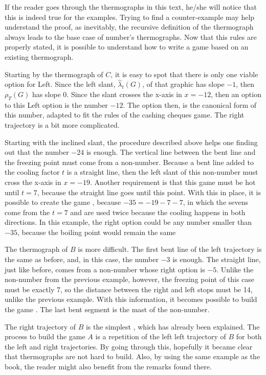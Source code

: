 If the reader goes through the thermographs in this text, he/she will notice that this is indeed true for the examples. Trying to find a counter-example may help understand the proof, as inevitably, the recursive definition of the thermograph always leads to the base case of number's thermographs. Now that this rules are properly stated, it is possible to understand how to write a game  based on an existing thermograph.

Starting by the thermograph of $C$, it is easy to spot that there is only one viable option for Left. Since the left slant, $\overset{\sim}{\lambda}_t(G)$, of that graphic has slope ${-1}$, then $\rho_T(G)$ has slope 0. Since the slant crosses the x-axis in $x={-12}$, then an option to this Left option is the number ${-12}$. The option then, is the canonical form of this number, adapted to fit the rules of the cashing cheques game. The right trajectory is a bit more complicated.

Starting with the inclined slant, the procedure described above helps one finding out that the number ${-24}$ is enough. The vertical line between the bent line and the freezing point must come from a non-number. Because a bent line added to the cooling factor $t$ is a straight line, then the left slant of this non-number must cross the x-axis in $x={-19}$. Another requirement is that this game must be hot until $t=7$, because the straight line goes until this point. With this in place, it is possible to create the game , because ${-35} = {-19} - 7 - 7$, in which the sevens come from the $t=7$ and are used twice because the cooling happens in both directions. In this example, the right option could be any number smaller than ${-35}$, because the boiling point would remain the same

The thermograph of $B$ is more difficult. The first bent line of the left trajectory is the same as before, and, in this case, the number ${-3}$ is enough. The straight line, just like before, comes from a non-number whose right option is ${-5}$. Unlike the non-number from the previous example, however, the freezing point of this case must be exactly 7, so the distance between the right and left stops must be 14, unlike the previous example. With this information, it becomes possible to build the game . The last bent segment is the mast of the non-number.

The right trajectory of $B$ is the simplest , which has already been explained. The process to build the game $A$ is a repetition of the left left trajectory of $B$ for both the left and right trajectories. By going through this, hopefully it became clear that thermographs are not hard to build. Also, by using the same example as the book, the reader might also benefit from the remarks found there.

